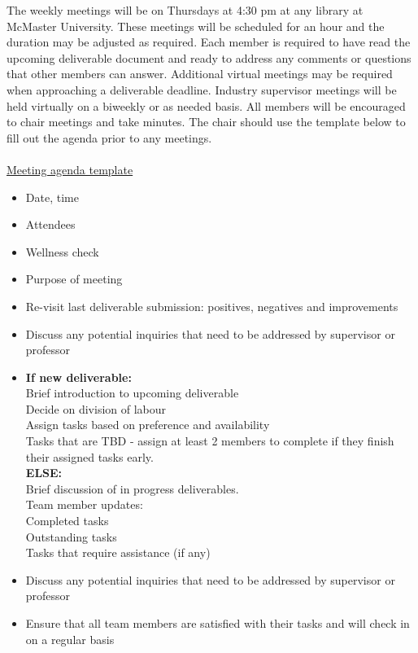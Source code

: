 \documentclass{article}
\begin{document}
The weekly meetings will be on Thursdays at 4:30 pm at any library at McMaster University. These meetings will be scheduled for an hour and the duration may be adjusted as required.
Each member is required to have read the upcoming deliverable document and ready to address any comments or questions that other members can answer. Additional virtual meetings may be required when approaching a deliverable deadline. Industry supervisor meetings will be held virtually on a biweekly or as needed basis. All members will be encouraged to chair meetings and take minutes. The chair should use the template below to fill out the agenda prior to any meetings. \\
\\
\underline{Meeting agenda template} 
\begin{itshape}
  \begin{flushleft}
    \begin{itemize}
      \item Date, time   
      \item Attendees 
      \item Wellness check 
      \item Purpose of meeting
      \item Re-visit last deliverable submission: positives, negatives and improvements \\
      \item Discuss any potential inquiries that need to be addressed by supervisor or professor \\
      \item \textbf{If new deliverable:}  \\
      Brief introduction to upcoming deliverable \\
      Decide on division of labour \\
      Assign tasks based on preference and availability \\
      Tasks that are TBD - assign at least 2 members to complete if they finish their assigned tasks early. \\
  \textbf{ELSE:} \\
  Brief discussion of in progress deliverables. \\
  Team member updates:\\
  \hspace{0.5cm}
  Completed tasks \\
  \hspace{0.5cm}
  Outstanding tasks \\
  \hspace{0.5cm}
  Tasks that require assistance (if any)\\
  
      \item Discuss any potential inquiries that need to be addressed by supervisor or professor \\
      \item Ensure that all team members are satisfied with their tasks and will check in on a regular basis 
     \end{itemize}

  \end{flushleft}
\end{itshape}
\end{document}
